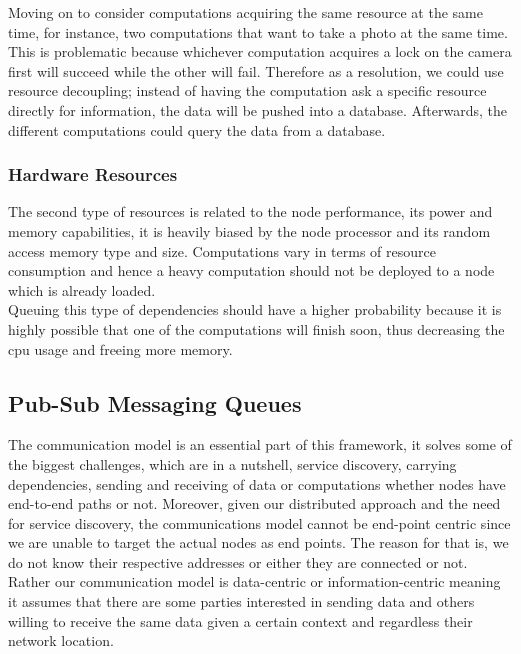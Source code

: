   \noindent Moving on to consider computations acquiring the same resource at the same time, for instance, two computations that want to take a photo at the same time. This is problematic because whichever computation acquires a lock on the camera first will succeed while the other will fail. Therefore as a resolution, we could use resource decoupling; instead of having the computation ask a specific resource directly for information, the  data will be pushed into a database. Afterwards, the different computations could query the data from a database.
  
  

\subsubsection{Hardware Resources }

The second type of resources is related to the node performance, its power and memory capabilities, it is heavily biased by the  node processor  and its random access memory type and size. Computations vary in terms of resource consumption and hence a heavy computation should not be deployed to a node which is already loaded. \\

\noindent Queuing this type of dependencies should have a higher probability because it is highly possible that one of the computations will finish soon, thus decreasing the cpu usage and freeing more memory.







\subsection{Pub-Sub Messaging Queues}\label{subsec:pub-sub}

The communication model is an essential part of this framework, it solves some of the biggest challenges, which are in a nutshell, service discovery, carrying dependencies, sending and receiving of data or computations whether nodes have  end-to-end paths or not. Moreover, given our distributed approach and the need for service discovery, the communications model cannot be  end-point centric since we are unable to target the actual nodes as end points. The reason for that is, we do not know their respective addresses or either they are connected or not. Rather our communication model is data-centric or information-centric meaning it assumes that there are some parties interested in sending data and others willing to receive the same data given a certain context and regardless their network location. \\

